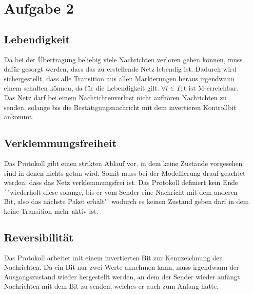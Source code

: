 \documentclass[10pt]{scrartcl}
\begin{document}
\section{Aufgabe 2}

\subsection{Lebendigkeit}
Da bei der Übertragung beliebig viele Nachrichten verloren gehen können, muss dafür gesorgt werden, dass das zu erstellende Netz lebendig ist. Dadurch wird sichergestellt, dass alle Transition aus allen Markierungen heraus irgendwann einem schalten können, da für die Lebendigkeit gilt: $\forall t \in T : \text{t ist M-erreichbar}$. Das Netz darf bei einem Nachrichtenverlust nicht aufhören Nachrichten zu senden, solange bis die Bestätigungsnachricht mit dem invertieren Kontrollbit ankommt.

\subsection{Verklemmungsfreiheit}
Das Protokoll gibt einen strikten Ablauf vor, in dem  keine Zustände vorgesehen sind in denen nichts getan wird. Somit muss bei der Modellierung drauf geachtet werden, dass das Netz verklemmungsfrei ist. Das Protokoll definiert kein Ende ´"wiederholt diese solange, bis er vom Sender eine Nachricht mit dem anderen Bit, also das nächste Paket erhält"' wodurch es keinen Zustand geben darf in dem keine Transition mehr aktiv ist.

\subsection{Reversibilität}
Das Protokoll arbeitet mit einem invertierten Bit zur Kennzeichnung der Nachrichten. Da ein Bit nur zwei Werte annehmen kann, muss irgendwann der Ausgangszustand wieder hergestellt werden, an dem der Sender wieder anfängt Nachrichten mit dem Bit zu senden, welches er auch zum Anfang hatte.
\end{document}
